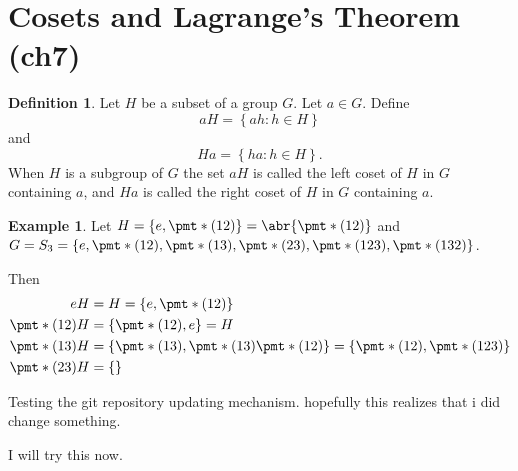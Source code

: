 \documentclass[11pt]{article}
\newcommand{\cbr}[1]{\left\{#1\right\}}
\theoremstyle{remark}
\theoremstyle{definition}
\newtheorem{definition}{Definition}[section]
\theoremstyle{remark}
\theoremstyle{definition}
\newtheorem*{example}{Example}
\theoremstyle{remark}
\begin{document}
\section{Cosets and Lagrange's Theorem (ch7)}

\begin{definition}
  Let $H$ be a subset of a group $G$. Let $a\in G$. Define $$aH = \cbr{ah : h\in H}$$ and $$Ha = \cbr{ha : h\in H}.$$ When $H$ is a subgroup of $G$ the set $aH$ is called the left coset of $H$ in $G$ containing $a$, and $Ha$ is called the right coset of $H$ in $G$ containing $a$.
\end{definition}

\begin{example}
  Let $H = \cbr{e,\pmt*{(12)}} = \abr{\pmt*{(12)}}$ and $G = S_3 = \cbr{e,\pmt*{(12)}, \pmt*{(13)}, \pmt*{(23)}, \pmt*{(123)}, \pmt*{(132)} }$.

  Then \begin{align*}
    eH &= H = \cbr{e,\pmt*{(12)}}\\
    \pmt*{(12)}H &= \cbr{\pmt*{(12)},e} = H\\ 
    \pmt*{(13)}H &= \cbr{\pmt*{(13)}, \pmt*{(13)}\pmt*{(12)}} = \cbr{\pmt*{(12)}, \pmt*{(123)}} \\
    \pmt*{(23)}H &= \cbr{}
  \end{align*}
\end{example}

Testing the git repository updating mechanism.
hopefully this realizes that i did change something.

I will try this now.
\end{document}
